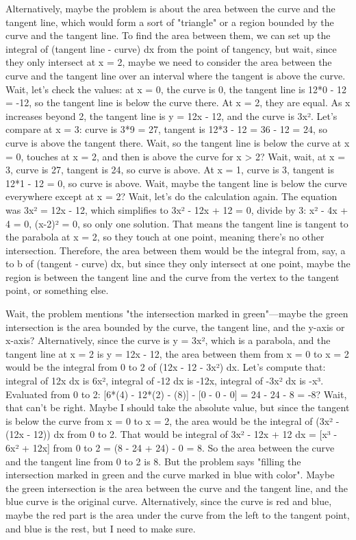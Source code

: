 Alternatively, maybe the problem is about the area between the curve and the tangent line, which would form a sort of "triangle" or a region bounded by the curve and the tangent line. To find the area between them, we can set up the integral of (tangent line - curve) dx from the point of tangency, but wait, since they only intersect at x = 2, maybe we need to consider the area between the curve and the tangent line over an interval where the tangent is above the curve. Wait, let's check the values: at x = 0, the curve is 0, the tangent line is 12*0 - 12 = -12, so the tangent line is below the curve there. At x = 2, they are equal. As x increases beyond 2, the tangent line is y = 12x - 12, and the curve is 3x². Let's compare at x = 3: curve is 3*9 = 27, tangent is 12*3 - 12 = 36 - 12 = 24, so curve is above the tangent there. Wait, so the tangent line is below the curve at x = 0, touches at x = 2, and then is above the curve for x > 2? Wait, wait, at x = 3, curve is 27, tangent is 24, so curve is above. At x = 1, curve is 3, tangent is 12*1 - 12 = 0, so curve is above. Wait, maybe the tangent line is below the curve everywhere except at x = 2? Wait, let's do the calculation again. The equation was 3x² = 12x - 12, which simplifies to 3x² - 12x + 12 = 0, divide by 3: x² - 4x + 4 = 0, (x-2)² = 0, so only one solution. That means the tangent line is tangent to the parabola at x = 2, so they touch at one point, meaning there's no other intersection. Therefore, the area between them would be the integral from, say, a to b of (tangent - curve) dx, but since they only intersect at one point, maybe the region is between the tangent line and the curve from the vertex to the tangent point, or something else.

Wait, the problem mentions "the intersection marked in green"—maybe the green intersection is the area bounded by the curve, the tangent line, and the y-axis or x-axis? Alternatively, since the curve is y = 3x², which is a parabola, and the tangent line at x = 2 is y = 12x - 12, the area between them from x = 0 to x = 2 would be the integral from 0 to 2 of (12x - 12 - 3x²) dx. Let's compute that: integral of 12x dx is 6x², integral of -12 dx is -12x, integral of -3x² dx is -x³. Evaluated from 0 to 2: [6*(4) - 12*(2) - (8)] - [0 - 0 - 0] = 24 - 24 - 8 = -8? Wait, that can't be right. Maybe I should take the absolute value, but since the tangent is below the curve from x = 0 to x = 2, the area would be the integral of (3x² - (12x - 12)) dx from 0 to 2. That would be integral of 3x² - 12x + 12 dx = [x³ - 6x² + 12x] from 0 to 2 = (8 - 24 + 24) - 0 = 8. So the area between the curve and the tangent line from 0 to 2 is 8. But the problem says "filling the intersection marked in green and the curve marked in blue with color". Maybe the green intersection is the area between the curve and the tangent line, and the blue curve is the original curve. Alternatively, since the curve is red and blue, maybe the red part is the area under the curve from the left to the tangent point, and blue is the rest, but I need to make sure.

